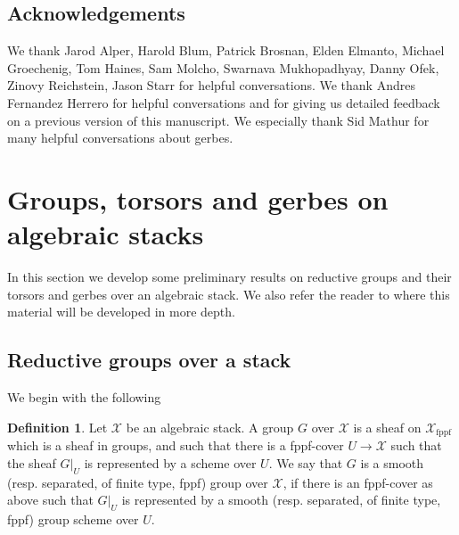 \documentclass{amsart}
\theoremstyle{definition}
\newtheorem{definition}[definition]{Definition}
\newcommand{\cX}{\mathcal{X}}
\newcommand{\fppf}{\operatorname{fppf}}
\begin{document}
\subsection{Acknowledgements} We thank Jarod Alper, Harold Blum, Patrick Brosnan, Elden Elmanto, Michael Groechenig, Tom Haines, Sam Molcho, Swarnava Mukhopadhyay, Danny Ofek, Zinovy Reichstein, Jason Starr for helpful conversations. We thank Andres Fernandez Herrero for helpful conversations and for giving us detailed feedback on a previous version of this manuscript. We especially thank Sid Mathur for many helpful conversations about gerbes. 

\section{Groups, torsors and gerbes on algebraic stacks}
In this section we develop some preliminary results on reductive groups and their torsors and gerbes over an algebraic stack. We also refer the reader to \cite{good_moduli_gerbe} where this material will be developed in more depth. 

\subsection{Reductive groups over a stack}\label{subsection_red_groups}
We begin with the following
\begin{definition}
    Let $\cX$ be an algebraic stack. A group $G$ over $\cX$ is a sheaf on $\cX_{\fppf}$ which is a sheaf in groups, and such that there is a fppf-cover $U\to \cX$ such that the sheaf $G|_U$ is represented by a scheme over $U$. We say that $G$ is a smooth (resp. separated, of finite type, fppf) group over $\cX$, if there is an fppf-cover as above such that $G|_U$ is represented by a smooth (resp. separated, of finite type, fppf) group scheme over $U$.
\end{definition}
\end{document}
